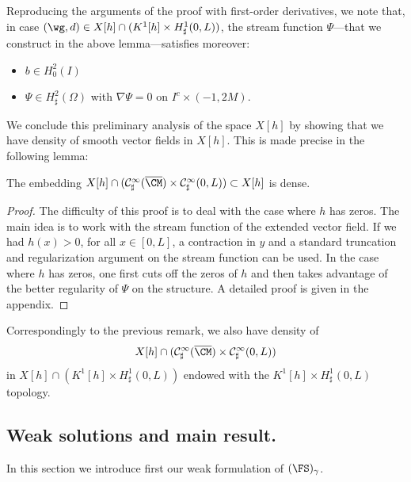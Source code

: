 Reproducing the arguments of the proof with first-order derivatives, we note that, in case $(\wg,d) \in X[h] \cap (K^1[h] \times H^1_{\sharp}(0,L))$, the stream function $\Psi$---that we construct in the above lemma---satisfies moreover:\enlargethispage{.5\baselineskip}%
\begin{itemize}
\item $ b \in H^2_0(I)$
\item $ \Psi \in H^2_{\sharp}(\Omega)$ with $\nabla \Psi = 0$ on $I^c \times (-1,2M)$.
\end{itemize}
We conclude this preliminary analysis of the space $X[h]$
by showing that we have density of smooth vector fields in
$X[h]$. This is made precise in the following lemma:

\begin{lemma}\label{lemma.density}The embedding $X[h]\cap (\mathcal{C}_\sharp^{\infty}(\overline{\CM})\times\mathcal{C}_\sharp^{\infty}(0, L))\subset X[h]$ is dense.
\end{lemma}
\begin{proof}
The difficulty of this proof is to deal with the case where $h$ has zeros. The main idea is to work with the stream function
of the extended vector field. If we had $h(x)>0$, for all $x\in [0, L]$, a contraction in $y$ and a standard truncation and regularization argument on the stream function can be used. In the case where $h$ has zeros, one first cuts off the zeros of $h$ and then takes advantage of the better regularity of $\Psi$ on the structure. A detailed proof is given in the appendix.
\end{proof}

Correspondingly to the previous remark, we also have density of\vspace*{-3pt}
\[
X[h] \cap (\mathcal{C}_\sharp^{\infty}(\overline{\CM})\times\mathcal{C}_\sharp^{\infty}(0, L))
\]
in $X[h] \cap (K^1[h] \times H^1_{\sharp}(0,L))$ endowed with the $K^1[h] \times H^1_{\sharp}(0,L)$
topology.

\subsection{Weak solutions and main result.}

In this section we introduce first our weak formulation of $(\FS)_{\gamma}$.

